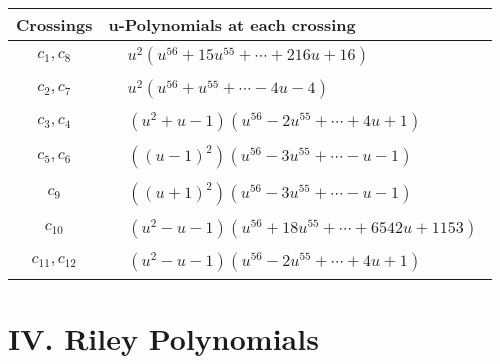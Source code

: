 \documentclass[1p]{elsarticle_modified}
\theoremstyle{definition}
\begin{document}
\begin{tabular}{m{50pt}|m{274pt}}
Crossings & \hspace{64pt}u-Polynomials at each crossing \\
\hline $$\begin{aligned}c_{1},c_{8}\end{aligned}$$&$\begin{aligned}
&u^2(u^{56}+15 u^{55}+\cdots+216 u+16)
\end{aligned}$\\
\hline $$\begin{aligned}c_{2},c_{7}\end{aligned}$$&$\begin{aligned}
&u^2(u^{56}+u^{55}+\cdots-4 u-4)
\end{aligned}$\\
\hline $$\begin{aligned}c_{3},c_{4}\end{aligned}$$&$\begin{aligned}
&(u^2+u-1)(u^{56}-2 u^{55}+\cdots+4 u+1)
\end{aligned}$\\
\hline $$\begin{aligned}c_{5},c_{6}\end{aligned}$$&$\begin{aligned}
&((u-1)^2)(u^{56}-3 u^{55}+\cdots- u-1)
\end{aligned}$\\
\hline $$\begin{aligned}c_{9}\end{aligned}$$&$\begin{aligned}
&((u+1)^2)(u^{56}-3 u^{55}+\cdots- u-1)
\end{aligned}$\\
\hline $$\begin{aligned}c_{10}\end{aligned}$$&$\begin{aligned}
&(u^2- u-1)(u^{56}+18 u^{55}+\cdots+6542 u+1153)
\end{aligned}$\\
\hline $$\begin{aligned}c_{11},c_{12}\end{aligned}$$&$\begin{aligned}
&(u^2- u-1)(u^{56}-2 u^{55}+\cdots+4 u+1)
\end{aligned}$\\
\hline
\end{tabular}\newpage\renewcommand{\arraystretch}{1}
\centering \section*{ IV. Riley Polynomials}
\end{document}
